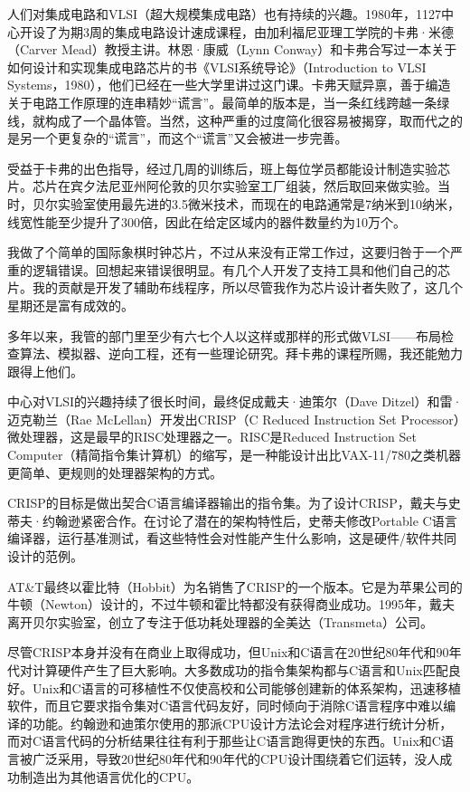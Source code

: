 \documentclass[a4paper,12pt,UTF8,twoside]{ctexbook}
\begin{document}
人们对集成电路和VLSI（超大规模集成电路）也有持续的兴趣。1980年，1127中心开设了为期3周的集成电路设计速成课程，由加利福尼亚理工学院的卡弗·米德（Carver Mead）教授主讲。林恩·康威（Lynn Conway）和卡弗合写过一本关于如何设计和实现集成电路芯片的书《VLSI系统导论》（Introduction to VLSI Systems，1980），他们已经在一些大学里讲过这门课。卡弗天赋异禀，善于编造关于电路工作原理的连串精妙“谎言”。最简单的版本是，当一条红线跨越一条绿线，就构成了一个晶体管。当然，这种严重的过度简化很容易被揭穿，取而代之的是另一个更复杂的“谎言”，而这个“谎言”又会被进一步完善。

受益于卡弗的出色指导，经过几周的训练后，班上每位学员都能设计制造实验芯片。芯片在宾夕法尼亚州阿伦敦的贝尔实验室工厂组装，然后取回来做实验。当时，贝尔实验室使用最先进的3.5微米技术，而现在的电路通常是7纳米到10纳米，线宽性能至少提升了300倍，因此在给定区域内的器件数量约为10万个。

我做了个简单的国际象棋时钟芯片，不过从来没有正常工作过，这要归咎于一个严重的逻辑错误。回想起来错误很明显。有几个人开发了支持工具和他们自己的芯片。我的贡献是开发了辅助布线程序，所以尽管我作为芯片设计者失败了，这几个星期还是富有成效的。

多年以来，我管的部门里至少有六七个人以这样或那样的形式做VLSI——布局检查算法、模拟器、逆向工程，还有一些理论研究。拜卡弗的课程所赐，我还能勉力跟得上他们。

中心对VLSI的兴趣持续了很长时间，最终促成戴夫·迪策尔（Dave Ditzel）和雷·迈克勒兰（Rae McLellan）开发出CRISP（C Reduced Instruction Set Processor）微处理器，这是最早的RISC处理器之一。RISC是Reduced Instruction Set Computer（精简指令集计算机）的缩写，是一种能设计出比VAX-11/780之类机器更简单、更规则的处理器架构的方式。

CRISP的目标是做出契合C语言编译器输出的指令集。为了设计CRISP，戴夫与史蒂夫·约翰逊紧密合作。在讨论了潜在的架构特性后，史蒂夫修改Portable C语言编译器，运行基准测试，看这些特性会对性能产生什么影响，这是硬件/软件共同设计的范例。

AT\&T最终以霍比特（Hobbit）为名销售了CRISP的一个版本。它是为苹果公司的牛顿（Newton）设计的，不过牛顿和霍比特都没有获得商业成功。1995年，戴夫离开贝尔实验室，创立了专注于低功耗处理器的全美达（Transmeta）公司。

尽管CRISP本身并没有在商业上取得成功，但Unix和C语言在20世纪80年代和90年代对计算硬件产生了巨大影响。大多数成功的指令集架构都与C语言和Unix匹配良好。Unix和C语言的可移植性不仅使高校和公司能够创建新的体系架构，迅速移植软件，而且它要求指令集对C语言代码友好，同时倾向于消除C语言程序中难以编译的功能。约翰逊和迪策尔使用的那派CPU设计方法论会对程序进行统计分析，而对C语言代码的分析结果往往有利于那些让C语言跑得更快的东西。Unix和C语言被广泛采用，导致20世纪80年代和90年代的CPU设计围绕着它们运转，没人成功制造出为其他语言优化的CPU。
\end{document}
